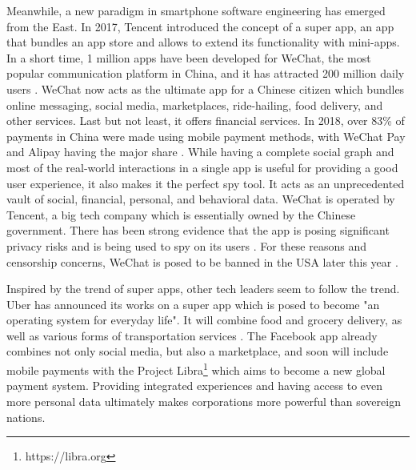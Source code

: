 Meanwhile, a new paradigm in smartphone software engineering has emerged from the East. In 2017, Tencent introduced the concept of a super app, an app that bundles an app store and allows to extend its functionality with mini-apps. In a short time, 1 million apps have been developed for WeChat, the most popular communication platform in China, and it has attracted 200 million daily users \cite{wechatapps}. WeChat now acts as the ultimate app for a Chinese citizen which bundles online messaging, social media, marketplaces, ride-hailing, food delivery, and other services. Last but not least, it offers financial services. In 2018, over 83\% of payments in China were made using mobile payment methods, with WeChat Pay and Alipay having the major share \cite{chinapayments}. While having a complete social graph and most of the real-world interactions in a single app is useful for providing a good user experience, it also makes it the perfect spy tool. It acts as an unprecedented vault of social, financial, personal, and behavioral data. WeChat is operated by Tencent, a big tech company which is essentially owned by the Chinese government. There has been strong evidence that the app is posing significant privacy risks and is being used to spy on its users \cite{wechatspy}. For these reasons and censorship concerns, WeChat is posed to be banned in the USA later this year \cite{wechatban}.

Inspired by the trend of super apps, other tech leaders seem to follow the trend. Uber has announced its works on a super app which is posed to become "an operating system for everyday life". It will combine food and grocery delivery, as well as various forms of transportation services \cite{superuber}. The Facebook app already combines not only social media, but also a marketplace, and soon will include mobile payments with the Project Libra\footnote{https://libra.org} which aims to become a new global payment system. Providing integrated experiences and having access to even more personal data ultimately makes corporations more powerful than sovereign nations.




